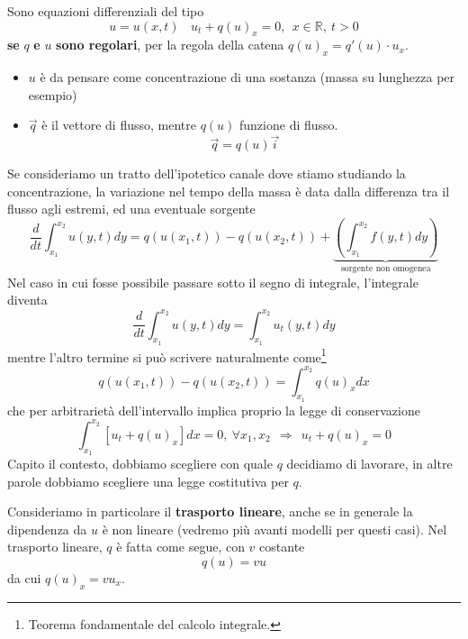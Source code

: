 \documentclass[10pt,a4paper,twoside,openright]{book}
\begin{document}
Sono equazioni differenziali del tipo
\begin{equation}
	u=u( x,t) \ \ \ \ u_{t} +q( u)_{x} =0,\ \ x\in \mathbb{R} ,\ t >0
\end{equation}
\textbf{se }$q$\textbf{ e }$u$\textbf{ sono regolari}, per la regola della catena $q( u)_{x} =q'( u) \cdotp u_{x}$.
\begin{itemize}
	\item $u$ è da pensare come concentrazione di una sostanza (massa su lunghezza per esempio)
	\item $\vec{q}$ è il vettore di flusso, mentre $q( u)$ funzione di flusso.
	      \begin{equation}
	      	\vec{q} =q( u)\vec{i}
	      \end{equation}
\end{itemize}

Se consideriamo un tratto dell'ipotetico canale dove stiamo studiando la concentrazione, la variazione nel tempo della massa è data dalla differenza tra il flusso agli estremi, ed una eventuale sorgente
\begin{equation*}
	\frac{d}{dt}\int ^{x_{2}}_{x_{1}} u( y,t) dy=q( u( x_{1} ,t)) -q( u( x_{2} ,t)) +\underbrace{\left(\int ^{x_{2}}_{x_{1}} f( y,t) dy\right)}_{\text{sorgente non omogenea}}
\end{equation*}
Nel caso in cui fosse possibile passare sotto il segno di integrale, l'integrale diventa
\begin{equation}
	\frac{d}{dt}\int ^{x_{2}}_{x_{1}} u( y,t) dy=\int ^{x_{2}}_{x_{1}} u_{t}( y,t) dy
	\label{eq:lc-passaggio-derivata-integrale}
\end{equation}
mentre l'altro termine si può scrivere naturalmente come\footnote{Teorema fondamentale del calcolo integrale.}
\begin{equation*}
	q( u( x_{1} ,t)) -q( u( x_{2} ,t)) =\int ^{x_{2}}_{x_{1}} q( u)_{x} dx
\end{equation*}
che per arbitrarietà dell'intervallo implica proprio la legge di conservazione
\begin{equation*}
	\int ^{x_{2}}_{x_{1}}[ u_{t} +q( u)_{x}] dx=0,\ \forall x_{1} ,x_{2} \ \ \Rightarrow \ \ u_{t} +q( u)_{x} =0
\end{equation*}
Capito il contesto, dobbiamo scegliere con quale $q$ decidiamo di lavorare, in altre parole dobbiamo scegliere una legge costitutiva per $q$.

Consideriamo in particolare il \textbf{trasporto lineare}, anche se in generale la dipendenza da $u$ è non lineare (vedremo più avanti modelli per questi casi). Nel trasporto lineare, $q$ è fatta come segue, con $v$ costante
\begin{equation}
	q( u) =vu
\end{equation}
da cui $q( u)_{x} =vu_{x}$.
\end{document}
